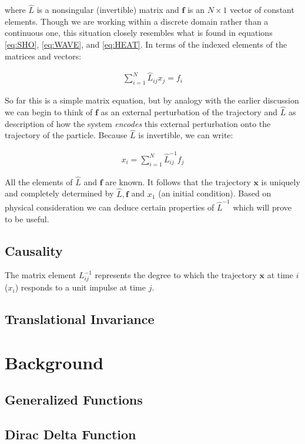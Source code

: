 \documentclass[11pt]{article}
\theoremstyle{plain}
\theoremstyle{definition}
\renewcommand{\vec}[1]{\mathbf{#1}} %
\begin{document}
where $\hat L$ is a nonsingular (invertible) matrix  and $\vec f$ is an $N \times 1$ vector of constant elements. Though we are working within a discrete domain rather than a continuous one, this situation closely resembles what is found in equations \eqref{eq:SHO}, \eqref{eq:WAVE}, and \eqref{eq:HEAT}. In terms of the indexed elements of the matrices and vectors:

\begin{align}
    \sum\limits_{i=1}^N \hat L_{ij} x_j = f_i
\end{align}

So far this is a simple matrix equation, but by analogy with the earlier discussion we can begin to think of $\vec f$ as an external perturbation of the trajectory and $\hat L$ as description of how the system \textit{encodes} this external perturbation onto the trajectory of the particle. Because $\hat L$ is invertible, we can write:

\begin{align}
    x_i = \sum\limits_{i=1}^N \hat L_{ij}^{-1} f_j
\end{align}

All the elements of $\hat L$ and $\vec f$ are known. It follows that the trajectory $\vec x$ is uniquely and completely determined by $\hat L, \vec f$ and $x_1$ (an initial condition). Based on physical consideration we can deduce certain properties of $\hat L^{-1}$ which will prove to be useful.

\subsection{Causality}

The matrix element $L_{ij}^{-1}$ represents the degree to which the trajectory $\vec x$ at time $i$ ($x_i$)  responds to a unit impulse at time $j$.

\subsection{Translational Invariance}

\section{Background}
\subsection{Generalized Functions}
\subsection{Dirac Delta Function}
\end{document}
